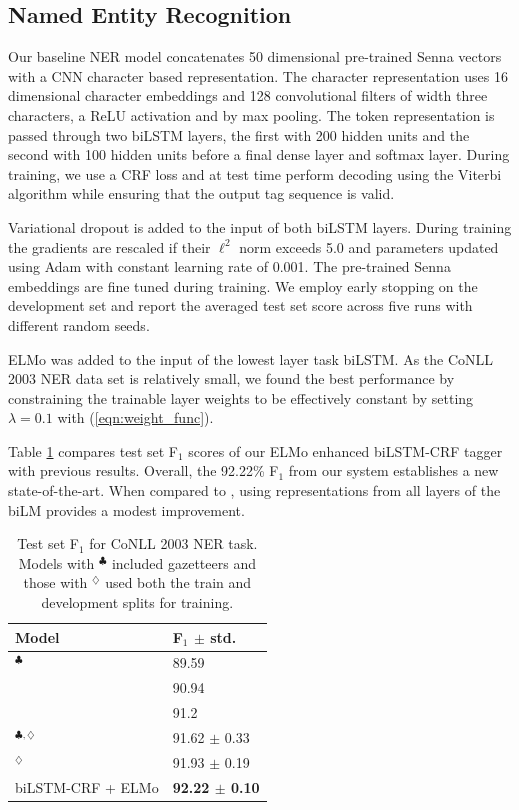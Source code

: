 \documentclass[11pt,a4paper]{article}
\newcommand{\ELMO}{ELMo}
\begin{document}
\subsection{Named Entity Recognition}
Our baseline NER model concatenates 50 dimensional pre-trained Senna vectors \citep{NLPfromScratch:Collobert2011} with a CNN character based representation.  The character representation uses 16 dimensional character embeddings and 128 convolutional filters of width three characters, a ReLU activation and by max pooling.  The token representation is passed through two biLSTM layers, the first with 200 hidden units and the second with 100 hidden units before a final dense layer and softmax layer.
During training, we use a CRF loss and at test time perform decoding using the Viterbi algorithm while ensuring that the output tag sequence is valid.

Variational dropout is added to the input of both biLSTM layers.
During training the gradients are rescaled if their $\ell^2$ norm exceeds 5.0 and parameters updated using Adam with constant learning rate of 0.001.
The pre-trained Senna embeddings are fine tuned during training.
We employ early stopping on the development set and report the averaged test set score across five runs with different random seeds.

\ELMO{} was added to the input of the lowest layer task biLSTM.
As the CoNLL 2003 NER data set is relatively small, we found the best performance by
constraining the trainable layer weights to be effectively constant by setting $\lambda=0.1$ with (\ref{eqn:weight_func}).

Table \ref{table:ner_test} compares test set F$_1$ scores of our \ELMO{} enhanced biLSTM-CRF tagger with previous results. 
Overall, the 92.22\% F$_1$ from our system establishes a new state-of-the-art.
When compared to \citet{Peters2017SemisupervisedST}, using representations from all layers of the biLM provides a modest improvement.

\begin{table}
\centering
\begin{tabular}{l|l}
\textbf{Model}                                & \textbf{F$_1$ $\pm$ std.} \\ \hline \hline
\citet{NLPfromScratch:Collobert2011}$^\clubsuit$ & 89.59 \\
\citet{lample-EtAl:2016:N16-1} & 90.94 \\
\citet{Ma2016EndtoendSL}                & 91.2     \\
\citet{chiu-nichols-2016}$^{\clubsuit,\diamondsuit}$         & 91.62 $\pm$ 0.33  \\
\citet{Peters2017SemisupervisedST}$^\diamondsuit$     & 91.93 $\pm$ 0.19   \\
biLSTM-CRF + \ELMO   & \textbf{92.22 $\pm$ 0.10}
\end{tabular}
\caption{Test set F$_1$ for CoNLL 2003 NER task.
Models with $^\clubsuit$ included gazetteers and those with $^\diamondsuit$ used both the train and development splits for training.
}
\label{table:ner_test}
\end{table}
\end{document}
